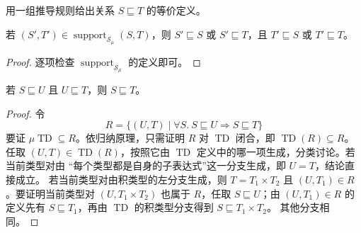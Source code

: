 \begin{exercise}[\(\star\)]
\label{ex:21.9.2}
用一组推导规则给出关系 \(S\sqsubseteq T\) 的等价定义。
\end{exercise}

\begin{lemma}
\label{lem:21.9.3}
若 \((S',T')\in\operatorname{support}_{\mathcal S_\mu}(S,T)\)，则
\(S'\sqsubseteq S\) 或 \(S'\sqsubseteq T\)，且
\(T'\sqsubseteq S\) 或 \(T'\sqsubseteq T\)。
\end{lemma}

\begin{proof}
逐项检查 \(\operatorname{support}_{\mathcal S_\mu}\) 的定义即可。
\end{proof}


\begin{lemma}
\label{lem:21.9.4}
若 \(S\sqsubseteq U\) 且 \(U\sqsubseteq T\)，则 \(S\sqsubseteq T\)。
\end{lemma}

\begin{proof}
令
\[
R=\{(U,T)\mid\forall S.\ S\sqsubseteq U\Rightarrow S\sqsubseteq T\}
\]
要证 \(\mu\operatorname{TD}\subseteq R\)。依归纳原理，只需证明
\(R\) 对 \(\operatorname{TD}\) 闭合，即
\(\operatorname{TD}(R)\subseteq R\)。任取
\((U,T)\in\operatorname{TD}(R)\)，按照它由
\(\operatorname{TD}\) 定义中的哪一项生成，分类讨论。若当前类型对由
“每个类型都是自身的子表达式”这一分支生成，即 \(U=T\)，结论直接成立。
若当前类型对由积类型的左分支生成，则
\(T=T_1\times T_2\) 且 \((U,T_1)\in R\)。要证明当前类型对
\((U,T_1\times T_2)\) 也属于 \(R\)，任取 \(S\sqsubseteq U\)；由
\((U,T_1)\in R\) 的定义先有 \(S\sqsubseteq T_1\)，再由
\(\operatorname{TD}\) 的积类型分支得到 \(S\sqsubseteq T_1\times T_2\)。
其他分支相同。
\end{proof}

